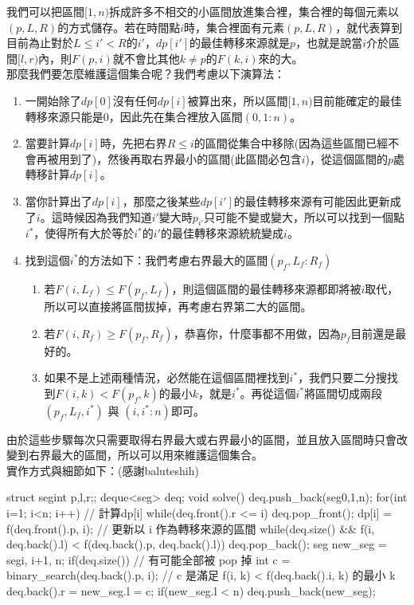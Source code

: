 \documentclass[main.tex]{subfiles}
\begin{document}
	我們可以把區間$[1, n)$拆成許多不相交的小區間放進集合裡，集合裡的每個元素以$(p, L, R)$的方式儲存。若在時間點$i$時，集合裡面有元素$(p, L, R)$，就代表算到目前為止對於$L\leq i' < R$的$i'$，$dp[i']$的最佳轉移來源就是$p$，也就是說當$i$介於區間$[l, r)$內，則$F(p, i)$就不會比其他$k \not=p$的$F(k, i)$來的大。\\
	那麼我們要怎麼維護這個集合呢？我們考慮以下演算法：
	\begin{enumerate}
		\item 一開始除了$dp[0]$沒有任何$dp[i]$被算出來，所以區間$[1, n)$目前能確定的最佳轉移來源只能是$0$，因此先在集合裡放入區間$(0, 1: n)$。
		\item 當要計算$dp[i]$時，先把右界$R \leq i$的區間從集合中移除(因為這些區間已經不會再被用到了)，然後再取右界最小的區間(此區間必包含$i$)，從這個區間的$p$處轉移計算$dp[i]$。
		\item 當你計算出了$dp[i]$，那麼之後某些$dp[i']$的最佳轉移來源有可能因此更新成了$i$。這時候因為我們知道$i'$變大時$p_{i'}$只可能不變或變大，所以可以找到一個點$i^*$，使得所有大於等於$i^*$的$i'$的最佳轉移來源統統變成$i$。
		\item 找到這個$i^*$的方法如下：我們考慮右界最大的區間$(p_f, L_f: R_f)$
		\begin{enumerate}
			\item 若$F(i, L_f) \leq F(p_f, L_f)$，則這個區間的最佳轉移來源都即將被$i$取代，所以可以直接將區間拔掉，再考慮右界第二大的區間。
			\item 若$F(i, R_f) \geq F(p_f, R_f)$，恭喜你，什麼事都不用做，因為$p_f$目前還是最好的。
			\item 如果不是上述兩種情況，必然能在這個區間裡找到$i^*$，我們只要二分搜找到$F(i, k) < F(p_f, k)$的最小$k$，就是$i^*$。再從這個$i^*$將區間切成兩段$(p_f, L_f, i^*)$ 與 $(i, i^*: n)$即可。
		\end{enumerate}
	\end{enumerate}
	
	由於這些步驟每次只需要取得右界最大或右界最小的區間，並且放入區間時只會改變到右界最大的區間，所以可以用來維護這個集合。\\
	
	實作方式與細節如下：(感謝baluteshih)\\
	
	\begin{C++}
		struct seg{int p,l,r;};
		deque<seg> deq;
		void solve(){
			deq.push_back(seg{0,1,n});
			for(int i=1; i<n; i++){
				// 計算dp[i]
				while(deq.front().r <= i) deq.pop_front();
				dp[i] = f(deq.front().p, i);
				// 更新以 i 作為轉移來源的區間
				while(deq.size() &&
				f(i, deq.back().l) < f(deq.back().p, deq.back().l))
				deq.pop_back();
				seg new_seg = seg{i, i+1, n};
				if(deq.size()){ // 有可能全部被 pop 掉
					int c = binary_search(deq.back().p, i);
					// c 是滿足 f(i, k) < f(deq.back().i, k) 的最小 k
					deq.back().r = new_seg.l = c;
				}
				if(new_seg.l < n) deq.push_back(new_seg);
			}
		}
	\end{C++}
	
\end{document}
